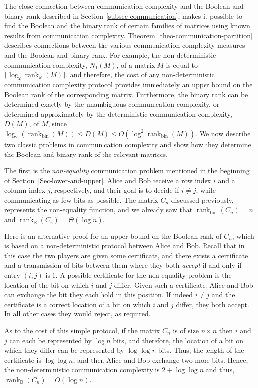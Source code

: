 \documentclass[11pt]{article}
\newcommand{\rank}{\mathop{\mathrm{rank}}}
\newcommand{\Rbool}{{\rank}_\mathbb{B}}
\newcommand{\Rbin}{{\rank}_{\mathrm{bin}}}
\begin{document}
The close connection between communication complexity and the Boolean and binary rank described in Section~\ref{subsec-communication},
makes it possible to find the Boolean and the binary rank of certain families of matrices using known results from communication complexity.
Theorem~\ref{theo-communication-partition} describes connections between the various  communication complexity measures and the Boolean and binary rank.
For example,  the non-deterministic communication complexity, $N_1(M)$, of a matrix $M$ is equal to $\lceil\log_2 \Rbool(M)\rceil$,
and therefore, the cost of any non-deterministic communication complexity protocol provides immediately an upper bound on the Boolean rank of the corresponding matrix.
Furthermore, the binary rank can be determined exactly by the unambiguous communication complexity,
or determined approximately by the deterministic communication complexity, $D(M)$, of $M$, since $\log_2 (\Rbin(M)) \leq D(M)  \leq O(\log^2 \Rbin(M))$.
We now describe two classic problems in communication complexity and show how they determine the Boolean and binary rank of the relevant matrices.

The first is the {\em non-equality} communication problem mentioned in the beginning of Section~\ref{Sec-lower-and-upper}.
Alice and Bob receive a row index $i$ and a column index $j$, respectively,
and their goal is to decide if $i \neq j$, while communicating as few bits as possible.
The matrix $C_n$ discussed previously, represents the non-equality function, and we already saw that $\Rbin(C_n) = n$ and $\Rbool(C_n) = \Theta(\log n)$.

Here is an alternative proof for an upper bound on the Boolean rank of $C_n$, which is based on a non-deterministic protocol between Alice and Bob.
Recall that in this case the two players are given some certificate,
and there exists a certificate and a transmission of bits between them where they both {\em accept} if and only if entry $(i,j)$ is $1$.
A possible certificate for the non-equality problem is the location of the bit on which $i$ and $j$ differ.
Given such a certificate, Alice and Bob can exchange the bit they each hold in this position.
If indeed $i \neq j$ and the certificate is a correct location of a bit on which $i$ and $j$ differ, they both accept.
In all other cases they would reject, as required.

As to the cost of this simple protocol, if the matrix $C_n$ is of size $n \times n$ then $i$ and $j$ can each be represented by $\log n$ bits,
and therefore, the location of a bit on which they differ can be represented by $\log \log n$ bits.
Thus, the length of the certificate is $\log \log n$, and then Alice and Bob exchange two more bits.
Hence, the non-deterministic communication complexity is $2+ \log \log n$ and thus, $\Rbool(C_n) = O(\log n)$.
\end{document}
